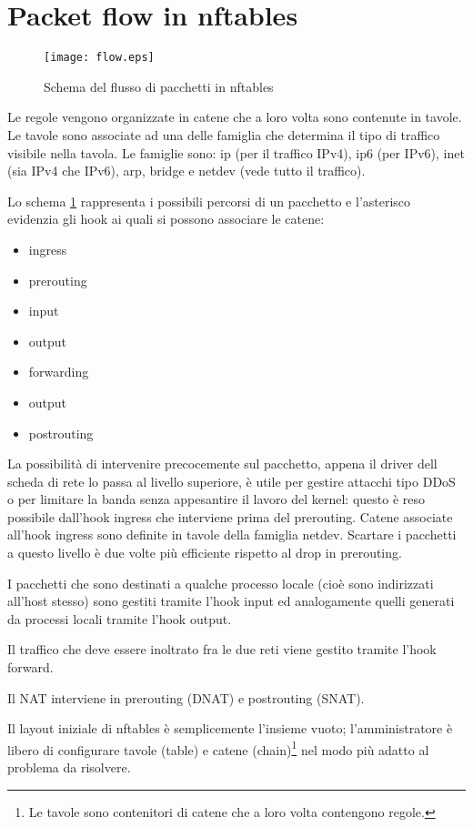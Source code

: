 \section{Packet flow in nftables}

\begin{figure}[H]
    \centering
    \texttt{[image: flow.eps]}
    \caption{Schema del flusso di pacchetti in nftables}
    \label{fig:flow}
\end{figure}
Le regole vengono organizzate in catene che a loro volta sono contenute in
tavole. Le tavole sono associate ad una delle famiglia che determina il tipo
di traffico visibile nella tavola. Le famiglie sono: ip (per il traffico
IPv4), ip6 (per IPv6),
inet (sia IPv4 che IPv6), arp, bridge e netdev (vede tutto il traffico).

Lo schema \ref{fig:flow} rappresenta i possibili percorsi di un pacchetto e
l'asterisco evidenzia gli hook ai quali si possono associare le catene:
\begin{itemize}
    \item ingress
    \item prerouting
    \item input
    \item output
    \item forwarding
    \item output
    \item postrouting
\end{itemize}
La possibilit\`a di intervenire precocemente sul pacchetto, appena il driver
dell scheda di rete lo passa al livello superiore, \`e utile per gestire
attacchi tipo DDoS o per limitare la banda senza appesantire il lavoro del
kernel: questo \`e reso possibile dall'hook ingress che interviene prima del
prerouting.
Catene associate all'hook ingress sono definite in tavole della
famiglia netdev. Scartare i pacchetti a questo livello \`e due volte
pi\`u efficiente rispetto al drop in prerouting.

I pacchetti che sono destinati a qualche processo locale (cioè sono indirizzati
all'host stesso) sono gestiti tramite l'hook input ed analogamente quelli
generati da processi locali tramite l'hook output.

Il traffico che deve essere inoltrato fra le due reti viene gestito tramite
l'hook forward.

Il NAT interviene in prerouting (DNAT) e postrouting (SNAT).

Il layout iniziale di nftables \`e semplicemente l'insieme vuoto;
l'amministratore \`e libero di configurare tavole (table) e catene
(chain)\footnote{Le tavole sono contenitori di catene che a loro volta
contengono regole.} nel modo pi\`u adatto al problema da risolvere.

